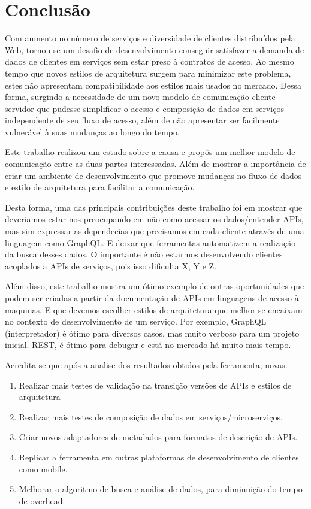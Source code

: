\chapter{Conclusão}

Com aumento no número de serviços e diversidade de clientes distribuídos pela Web, tornou-se um desafio de desenvolvimento conseguir satisfazer a demanda de dados de clientes em serviços sem estar preso à contratos de acesso. Ao mesmo tempo que novos estilos de arquitetura surgem para minimizar este problema, estes não apresentam compatibilidade aos estilos mais usados no mercado. Dessa forma, surgindo a necessidade de um novo modelo de comunicação cliente-servidor que pudesse simplificar o acesso e composição de dados em serviços independente de seu fluxo de acesso, além de não apresentar ser facilmente vulnerável à suas mudanças ao longo do tempo.

Este trabalho realizou um estudo sobre a causa e propôs um melhor modelo de comunicação entre as duas partes interessadas. Além de mostrar a importância de criar um ambiente de desenvolvimento que promove mudanças no fluxo de dados e estilo de arquitetura para facilitar a comunicação.

Desta forma, uma das principais contribuições deste trabalho foi em mostrar que deveriamos estar nos preocupando em não como acessar os dados/entender APIs, mas sim expressar as dependecias que precisamos em cada cliente através de uma linguagem como GraphQL. E deixar que ferramentas automatizem a realização da busca desses dados. O importante é não estarmos desenvolvendo clientes acoplados a APIs de serviços, pois isso dificulta X, Y e Z.

Além disso, este trabalho mostra um ótimo exemplo de outras oportunidades que podem ser criadas a partir da documentação de APIs em linguagens de acesso à maquinas. E que devemos escolher estilos de arquitetura que melhor se encaixam no contexto de desenvolvimento de um serviço. Por exemplo, GraphQL (interpretador) é ótimo para diversos casos, mas muito verboso para um projeto inicial. REST, é ótimo para debugar e está no mercado há muito mais tempo.



Acredita-se que após a analise dos resultados obtidos pela ferramenta, novas.

\begin{enumerate}
\item Realizar mais testes de validação na transição versões de APIs e estilos de arquitetura
\item Realizar mais testes de composição de dados em serviços/microserviços.
\item Criar novos adaptadores de metadados para formatos de descrição de APIs.
\item Replicar a ferramenta em outras plataformas de desenvolvimento de clientes como mobile.
\item Melhorar o algoritmo de busca e análise de dados, para diminuição do tempo de overhead.
\end{enumerate}
